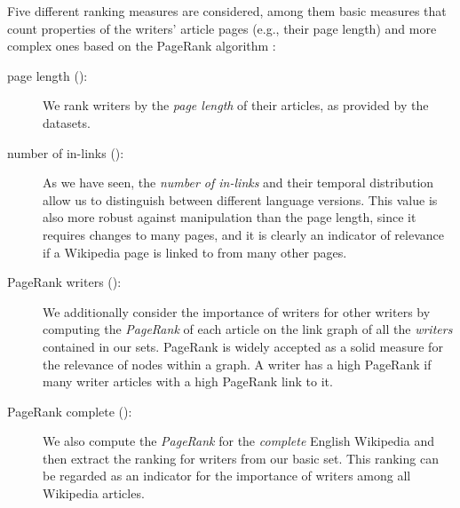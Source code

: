 \documentclass[a4paper,12pt]{scrartcl}
\begin{document}
Five different ranking measures are considered, among them basic
measures that count properties of the writers' article pages (e.g.,
their page length) and more complex ones based on the PageRank
algorithm \cite{brin1998anatomy}:
%
\begin{description}

\item[page length (\rpagelen):] We rank writers by the \emph{page
    length} of their articles, as provided by the
   datasets.

\item[number of in-links (\rinlinks):] As we have seen, the
  \emph{number of in-links} and their temporal distribution
  allow us to distinguish between different
  language versions. This value is also more robust against
  manipulation than the page length, since it requires changes to many
  pages,
  and it is clearly an indicator of relevance if a Wikipedia page
  is linked to from many other pages.
%
%

\item[PageRank writers (\rprwriter):] We additionally consider the
  importance of writers for other writers by computing the
  \emph{PageRank} \cite{brin1998anatomy} of each article on the link
  graph of all the \emph{writers} contained in our sets. PageRank
  is widely accepted as a solid measure for the relevance of nodes
  within a graph.
  A writer has a high PageRank if many writer articles with a high
  PageRank link to it.
\item[PageRank complete (\rprcomplete):] We also compute the
  \emph{PageRank} for the \emph{complete} English Wikipedia and then
  extract the ranking for writers from our basic set.  This ranking
  can be regarded as an indicator for the importance of writers among
  all Wikipedia articles.


\end{description}
\end{document}

